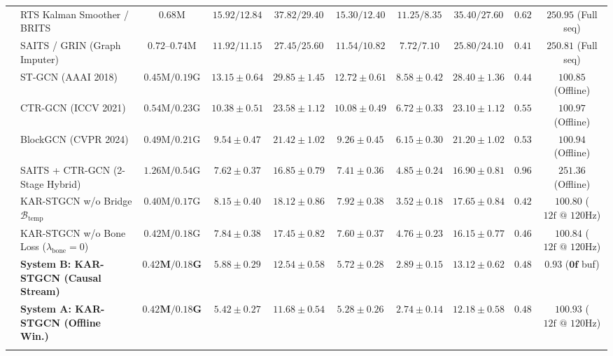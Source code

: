\documentclass[10pt,twocolumn]{article}
\begin{document}
\begin{table}[!t]
{\begin{tabular}{llcccccccc}
& RTS Kalman Smoother / BRITS \cite{cao2018brits} & $0.68\text{M}$ & $15.92 / 12.84$ & $37.82 / 29.40$ & $15.30 / 12.40$ & $11.25 / 8.35$ & $35.40 / 27.60$ & $0.62$ & $250.95$ (Full seq) \\
& SAITS \cite{du2023saits} / GRIN \cite{cini2022filling} (Graph Imputer) & $0.72\text{--}0.74\text{M}$ & $11.92 / 11.15$ & $27.45 / 25.60$ & $11.54 / 10.82$ & $7.72 / 7.10$ & $25.80 / 24.10$ & $0.41$ & $250.81$ (Full seq) \\
& ST-GCN \cite{yan2018spatial} (AAAI 2018) & $0.45\text{M} / 0.19\text{G}$ & $13.15 \pm 0.64$ & $29.85 \pm 1.45$ & $12.72 \pm 0.61$ & $8.58 \pm 0.42$ & $28.40 \pm 1.36$ & $0.44$ & $100.85$ (Offline) \\
& CTR-GCN \cite{chen2021channel} (ICCV 2021) & $0.54\text{M} / 0.23\text{G}$ & $10.38 \pm 0.51$ & $23.58 \pm 1.12$ & $10.08 \pm 0.49$ & $6.72 \pm 0.33$ & $23.10 \pm 1.12$ & $0.55$ & $100.97$ (Offline) \\
& BlockGCN \cite{zhou2024blockgcn} (CVPR 2024) & $0.49\text{M} / 0.21\text{G}$ & $9.54 \pm 0.47$ & $21.42 \pm 1.02$ & $9.26 \pm 0.45$ & $6.15 \pm 0.30$ & $21.20 \pm 1.02$ & $0.53$ & $100.94$ (Offline) \\
& SAITS + CTR-GCN (2-Stage Hybrid) & $1.26\text{M} / 0.54\text{G}$ & $7.62 \pm 0.37$ & $16.85 \pm 0.79$ & $7.41 \pm 0.36$ & $4.85 \pm 0.24$ & $16.90 \pm 0.81$ & $0.96$ & $251.36$ (Offline) \\
& KAR-STGCN w/o Bridge $\mathcal{B}_{\text{temp}}$ & $0.40\text{M} / 0.17\text{G}$ & $8.15 \pm 0.40$ & $18.12 \pm 0.86$ & $7.92 \pm 0.38$ & $3.52 \pm 0.18$ & $17.65 \pm 0.84$ & $0.42$ & $100.80$ ($12\text{f @ 120Hz}$) \\
& KAR-STGCN w/o Bone Loss ($\lambda_{\text{bone}}=0$) & $0.42\text{M} / 0.18\text{G}$ & $7.84 \pm 0.38$ & $17.45 \pm 0.82$ & $7.60 \pm 0.37$ & $4.76 \pm 0.23$ & $16.15 \pm 0.77$ & $0.46$ & $100.84$ ($12\text{f @ 120Hz}$) \\
& \textbf{System B: KAR-STGCN (Causal Stream)} & $\mathbf{0.42\text{M} / 0.18\text{G}}$ & $5.88 \pm 0.29$ & $12.54 \pm 0.58$ & $5.72 \pm 0.28$ & $2.89 \pm 0.15$ & $13.12 \pm 0.62$ & $0.48$ & $\mathbf{0.93}$ ($\mathbf{0\text{f}}$ buf) \\
& \textbf{System A: KAR-STGCN (Offline Win.)} & $\mathbf{0.42\text{M} / 0.18\text{G}}$ & $\mathbf{5.42 \pm 0.27}$ & $\mathbf{11.68 \pm 0.54}$ & $\mathbf{5.28 \pm 0.26}$ & $\mathbf{2.74 \pm 0.14}$ & $\mathbf{12.18 \pm 0.58}$ & $0.48$ & $100.93$ ($12\text{f @ 120Hz}$) \\
\midrule
{}

\end{tabular}}
\end{table}
\end{document}
